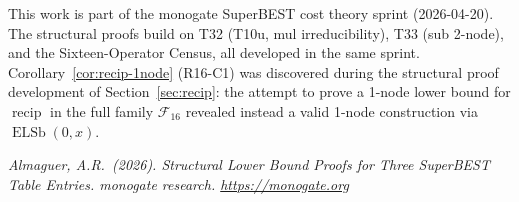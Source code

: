 \documentclass[12pt,a4paper]{article}
\theoremstyle{definition}
\newcommand{\ELSb}{\operatorname{ELSb}}
\newcommand{\F}{\mathcal{F}_{16}}
\newcommand{\recip}{\operatorname{recip}}
\begin{document}
This work is part of the monogate SuperBEST cost theory sprint (2026-04-20).
The structural proofs build on T32 (T10u, mul irreducibility), T33 (sub 2-node),
and the Sixteen-Operator Census, all developed in the same sprint.
Corollary~\ref{cor:recip-1node} (R16-C1) was discovered during the structural proof
development of Section~\ref{sec:recip}: the attempt to prove a 1-node lower bound
for $\recip$ in the full family $\F$ revealed instead a valid 1-node construction
via $\ELSb(0,x)$.

\bigskip
\noindent\textit{Almaguer, A.R.\ (2026).
Structural Lower Bound Proofs for Three SuperBEST Table Entries.
monogate research. \url{https://monogate.org}}
\end{document}
